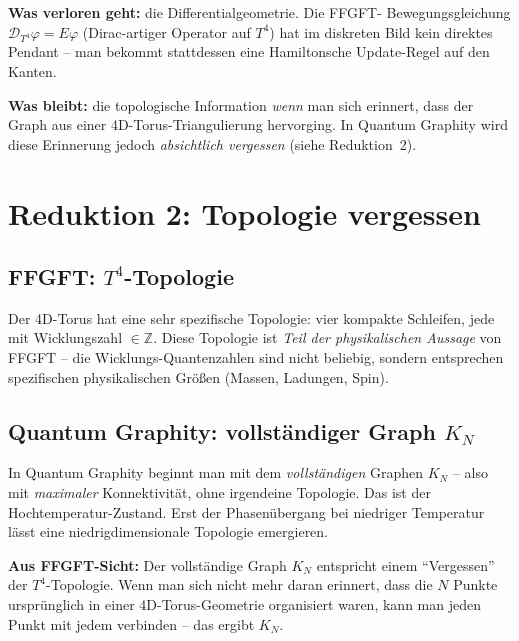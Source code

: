 \textbf{Was verloren geht:} die Differentialgeometrie. Die FFGFT-
Bewegungsgleichung $\mathcal{D}_{T^4}\varphi = E\varphi$
(Dirac-artiger Operator auf $T^4$) hat im diskreten Bild kein
direktes Pendant -- man bekommt stattdessen eine Hamiltonsche
Update-Regel auf den Kanten.

\textbf{Was bleibt:} die topologische Information \emph{wenn} man
sich erinnert, dass der Graph aus einer 4D-Torus-Triangulierung
hervorging. In Quantum Graphity wird diese Erinnerung jedoch
\emph{absichtlich vergessen} (siehe Reduktion~2).

\section{Reduktion 2: Topologie vergessen}

\subsection{\texorpdfstring{FFGFT: $T^4$-Topologie}{FFGFT: T4-Topologie}}

Der 4D-Torus hat eine sehr spezifische Topologie: vier kompakte
Schleifen, jede mit Wicklungszahl $\in \mathbb{Z}$. Diese Topologie
ist \emph{Teil der physikalischen Aussage} von FFGFT -- die
Wicklungs-Quantenzahlen sind nicht beliebig, sondern entsprechen
spezifischen physikalischen Größen (Massen, Ladungen, Spin).

\subsection{\texorpdfstring{Quantum Graphity: vollständiger Graph $K_N$}{Quantum Graphity: vollstaendiger Graph KN}}

In Quantum Graphity beginnt man mit dem \emph{vollständigen} Graphen
$K_N$ -- also mit \emph{maximaler} Konnektivität, ohne irgendeine
Topologie. Das ist der Hochtemperatur-Zustand. Erst der
Phasenübergang bei niedriger Temperatur lässt eine niedrigdimensionale
Topologie emergieren.

\textbf{Aus FFGFT-Sicht:} Der vollständige Graph $K_N$ entspricht
einem \enquote{Vergessen} der $T^4$-Topologie. Wenn man sich nicht
mehr daran erinnert, dass die $N$ Punkte ursprünglich in einer
4D-Torus-Geometrie organisiert waren, kann man jeden Punkt mit jedem
verbinden -- das ergibt $K_N$.


